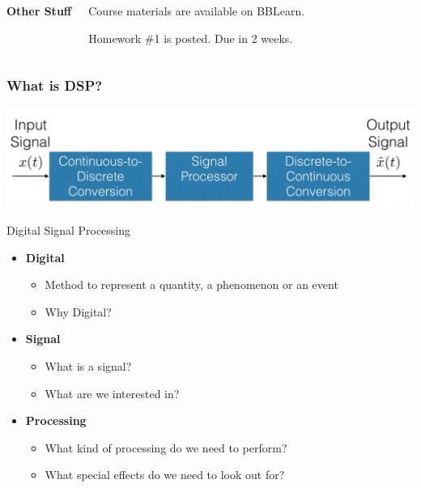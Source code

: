 \documentclass[mathserif,9pt]{beamer}
\begin{document}
\begin{frame}
\begin{columns}
    {\bf\color{blue!50!black}Other Stuff}
    \begin{mitemize}
      \item Course materials are available on BBLearn.  
      \item Homework \#1 is posted. Due in 2 weeks. 
    \end{mitemize}
    \vspace{1em}
  \end{columns}
\end{frame}



\begin{frame}\frametitle{What is DSP?}\small
  \begin{center}
    \includegraphics[width=.9\textwidth]{dsp_flow.pdf}
  \end{center}
  \begin{exampleblock}{\small Digital Signal Processing}
  \begin{itemize}
    \item {\bf\color{green!50!black}Digital} 
      \begin{itemize}
        \item Method to represent a quantity, a phenomenon or an event
        \item Why Digital?
      \end{itemize}
    \item {\bf\color{green!50!black}Signal}
      \begin{itemize}
        \item What is a signal?
        \item What are we interested in?
      \end{itemize}
    \item {\bf\color{green!50!black}Processing}
      \begin{itemize}
        \item What kind of processing do we need to perform?
        \item What special effects do we need to look out for?
      \end{itemize}
  \end{itemize}
  \end{exampleblock}
\end{frame}
\end{document}
